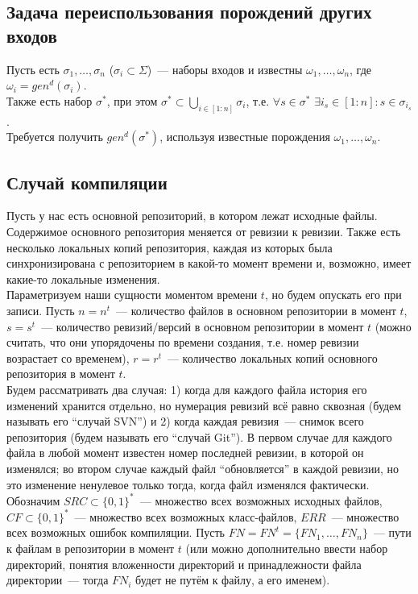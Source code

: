 \subsection{Задача переиспользования порождений других входов}

Пусть есть $\sigma_1, \dots, \sigma_n$ ($\sigma_i \subset \Sigma$)~--- наборы входов и известны $\omega_1, \dots, \omega_n$, где $\omega_i = gen^d(\sigma_i)$.\\
Также есть набор $\sigma^*$, при этом $\sigma^* \subset \bigcup\limits_{i \in [1:n]}\sigma_i$, т.е. $\forall s \in \sigma^*$ $\exists i_s \in [1:n]: s \in \sigma_{i_s}$.\\
Требуется получить $gen^d(\sigma^*)$, используя известные порождения $\omega_1, \dots, \omega_n$.

\subsection{Случай компиляции}

Пусть у нас есть основной репозиторий, в котором лежат исходные файлы. Содержимое основного репозитория меняется от ревизии к ревизии. Также есть несколько локальных копий репозитория, каждая из которых была синхронизирована с репозиторием в какой-то момент времени и, возможно, имеет какие-то локальные изменения.\\

Параметризуем наши сущности моментом времени $t$, но будем опускать его при записи. Пусть $n = n^t$~--- количество файлов в основном репозитории в момент  $t$, $s = s^t$~--- количество ревизий/версий в основном репозитории в момент $t$ (можно считать, что они упорядочены по времени создания, т.е. номер ревизии возрастает со временем), $r = r^t$~--- количество локальных копий основного репозитория в момент $t$.\\

Будем рассматривать два случая: 1) когда для каждого файла история его изменений хранится отдельно, но нумерация ревизий всё равно сквозная (будем называть его ``случай SVN'') и 2) когда каждая ревизия~--- снимок всего репозитория (будем называть его ``случай Git''). В первом случае для каждого файла в любой момент известен номер последней ревизии, в которой он изменялся; во втором случае каждый файл ``обновляется'' в каждой ревизии, но это изменение ненулевое только тогда, когда файл изменялся фактически.\\

Обозначим $SRC \subset \{0,1\}^*$~--- множество всех возможных исходных файлов, $CF \subset \{0,1\}^*$~--- множество всех возможных класс-файлов, $ERR$~--- множество всех возможных ошибок компиляции.
Пусть $FN = FN^t = \{FN_1, \dots, FN_n\}$~--- пути к файлам в репозитории в момент $t$ (или можно дополнительно ввести набор директорий, понятия вложенности директорий и принадлежности файла директории~--- тогда $FN_i$ будет не путём к файлу, а его именем).\\


